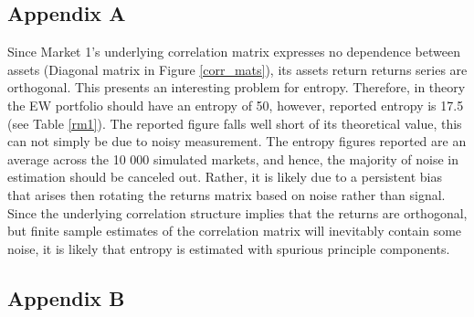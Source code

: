 \documentclass[11pt,preprint, authoryear]{elsarticle}
\numberwithin{equation}{section}
\numberwithin{figure}{section}
\numberwithin{table}{section}
\begin{document}
\hypertarget{appendix-a}{%
\subsection*{Appendix A}\label{appendix-a}}

Since Market 1's underlying correlation matrix expresses no dependence
between assets (Diagonal matrix in Figure \ref{corr_mats}), its assets
return returns series are orthogonal. This presents an interesting
problem for entropy. Therefore, in theory the EW portfolio should have
an entropy of 50, however, reported entropy is 17.5 (see Table
\ref{rm1}). The reported figure falls well short of its theoretical
value, this can not simply be due to noisy measurement. The entropy
figures reported are an average across the 10 000 simulated markets, and
hence, the majority of noise in estimation should be canceled out.
Rather, it is likely due to a persistent bias that arises then rotating
the returns matrix based on noise rather than signal. Since the
underlying correlation structure implies that the returns are
orthogonal, but finite sample estimates of the correlation matrix will
inevitably contain some noise, it is likely that entropy is estimated
with spurious principle components.

\hypertarget{appendix-b}{%
\subsection*{Appendix B}\label{appendix-b}}


\end{document}
